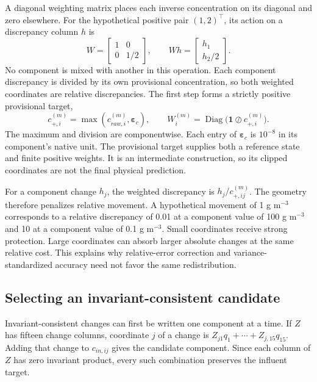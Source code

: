 A diagonal weighting matrix places each inverse concentration on its diagonal and zero elsewhere. For the hypothetical positive pair $(1,2)^\top$, its action on a discrepancy column $h$ is
\[
W=\begin{bmatrix}1&0\\0&1/2\end{bmatrix},\qquad
Wh=\begin{bmatrix}h_1\\h_2/2\end{bmatrix}.
\]
No component is mixed with another in this operation. Each component discrepancy is divided by its own provisional concentration, so both weighted coordinates are relative discrepancies. The first step forms a strictly positive provisional target,
\begin{equation}
c_{+,i}^{(m)}=\max(c_{raw,i}^{(m)},\boldsymbol{\varepsilon}_c),\qquad
W_i^{(m)}=\operatorname{Diag}\bigl(\mathbf{1}\oslash c_{+,i}^{(m)}\bigr).
\label{eq:projection_positive_target}
\end{equation}
The maximum and division are componentwise. Each entry of $\boldsymbol{\varepsilon}_c$ is $10^{-8}$ in its component's native unit. The provisional target supplies both a reference state and finite positive weights. It is an intermediate construction, so its clipped coordinates are not the final physical prediction.

For a component change $h_j$, the weighted discrepancy is $h_j/c_{+,ij}^{(m)}$. The geometry therefore penalizes relative movement. A hypothetical movement of 1 g m$^{-3}$ corresponds to a relative discrepancy of 0.01 at a component value of 100 g m$^{-3}$ and 10 at a component value of 0.1 g m$^{-3}$. Small coordinates receive strong protection. Large coordinates can absorb larger absolute changes at the same relative cost. This explains why relative-error correction and variance-standardized accuracy need not favor the same redistribution.

\subsection{Selecting an invariant-consistent candidate}

Invariant-consistent changes can first be written one component at a time. If $Z$ has fifteen change columns, coordinate $j$ of a change is $Z_{j1}q_1+\cdots+Z_{j,15}q_{15}$. Adding that change to $c_{in,ij}$ gives the candidate component. Since each column of $Z$ has zero invariant product, every such combination preserves the influent target.

